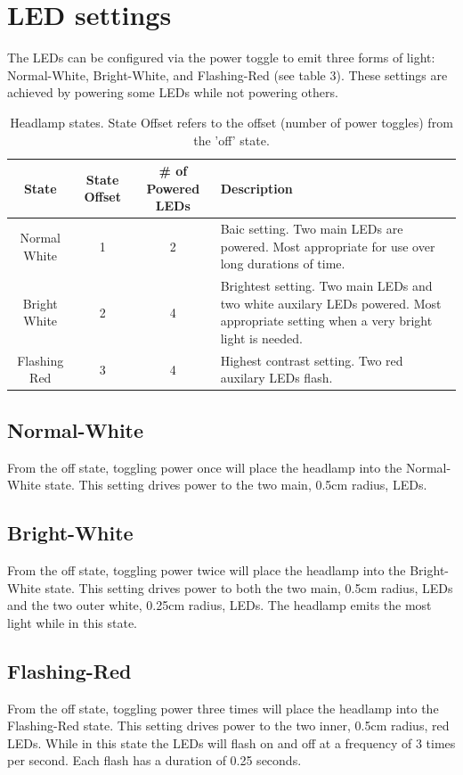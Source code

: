 \documentclass[12pt]{article}
\begin{document}
\section{LED settings}
The LEDs can be configured via the power toggle to emit three forms of light: Normal-White,
Bright-White, and Flashing-Red (see table 3). These settings are achieved by powering some LEDs while not
powering others.

\begin{table}
\begin{center}
\begin{tabular}{ | c | c | c | p{5cm} |}
    \hline
    State & State Offset & \# of Powered LEDs & Description \\ \hline
    Normal White & 1 & 2 &  Baic setting. Two main LEDs are powered. Most appropriate for use over
    long durations of time.\\ \hline
    Bright White & 2 & 4 &  Brightest setting. Two main LEDs and two white auxilary LEDs powered.
    Most appropriate setting when a very bright light is needed.\\ \hline
    Flashing Red & 3 & 4 &  Highest contrast setting. Two red auxilary LEDs flash.\\ \hline
\end{tabular}
\end{center}
\caption[Lamp Power States] {Headlamp states. State Offset refers to the offset (number of power toggles) from the 'off' state.}
\end{table}

\subsection{Normal-White}
From the off state, toggling power once will place the headlamp into the Normal-White state.  This
setting drives power to the two main, 0.5cm radius, LEDs.

\subsection{Bright-White}
From the off state, toggling power twice will place the headlamp into the Bright-White state.  This
setting drives power to both the two main, 0.5cm radius, LEDs and the two outer white, 0.25cm
radius, LEDs. The headlamp emits the most light while in this state.

\subsection{Flashing-Red}
From the off state, toggling power three times will place the headlamp into the Flashing-Red state.
This setting drives power to the two inner, 0.5cm radius, red LEDs. While in this state the
LEDs will flash on and off at a frequency of 3 times per second. Each flash has a duration of
0.25 seconds.
\end{document}
